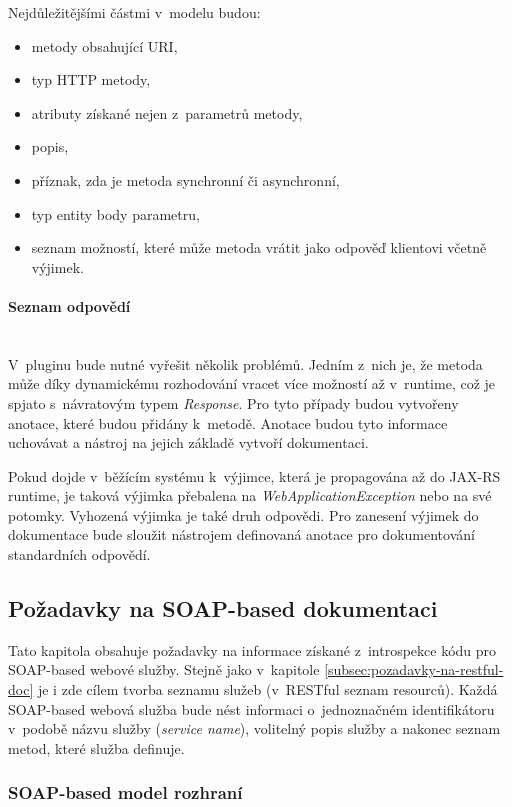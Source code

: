 \documentclass[11pt,twoside,a4paper]{book}
\begin{document}
Nejdůležitějšími částmi v~modelu budou:
\begin{itemize}
  \item metody obsahující URI,
  \item typ HTTP metody,
  \item atributy získané nejen z~parametrů metody,
  \item popis,
  \item příznak, zda je metoda synchronní či asynchronní,
  \item typ entity body parametru,
  \item seznam možností, které může metoda vrátit jako odpověď klientovi včetně
  výjimek.
\end{itemize}

\paragraph{Seznam odpovědí}
\mbox{}\\

V~pluginu bude nutné vyřešit několik problémů. Jedním z~nich je, že metoda může díky
dynamickému rozhodování vracet více možností až v~runtime, což je spjato s~návratovým
typem {\em Response}. Pro tyto případy budou vytvořeny anotace, které budou přidány k~metodě.
Anotace budou tyto informace uchovávat a nástroj na jejich základě vytvoří dokumentaci.

Pokud dojde v~běžícím systému k~výjimce, která je propagována až do JAX-RS runtime, je
taková výjimka přebalena na {\em WebApplicationException} nebo na své potomky.
Vyhozená výjimka je také druh odpovědi. Pro zanesení výjimek do dokumentace bude sloužit nástrojem
definovaná anotace pro dokumentování standardních odpovědí.

\subsection{Požadavky na SOAP-based dokumentaci}

Tato kapitola obsahuje požadavky na informace získané z~introspekce kódu pro SOAP-based webové služby.
Stejně jako v~kapitole \ref{subsec:pozadavky-na-restful-doc} je i zde 
cílem tvorba seznamu služeb (v~RESTful seznam resourců). Každá SOAP-based webová
služba bude nést informaci o~jednoznačném identifikátoru v~podobě názvu služby
({\em service name}), volitelný popis služby a nakonec seznam metod, které
služba definuje.

\subsubsection{SOAP-based model rozhraní}
\label{subsec:soap-model-rozhrani}
\end{document}
